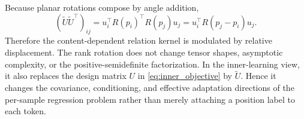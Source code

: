 Because planar rotations compose by angle addition,
\begin{equation}
  (\widetilde U\widetilde U^\top)_{ij}
  =u_i^\top R(p_i)^\top R(p_j)u_j
  =u_i^\top R(p_j-p_i)u_j.
  \label{eq:relative_kernel}
\end{equation}
Therefore the content-dependent relation kernel is modulated by relative displacement. The rank rotation does not change tensor shapes, asymptotic complexity, or the positive-semidefinite factorization.
In the inner-learning view, it also replaces the design matrix $U$ in
\cref{eq:inner_objective} by $\widetilde U$. Hence it changes the covariance,
conditioning, and effective adaptation directions of the per-sample regression
problem rather than merely attaching a position label to each token.
